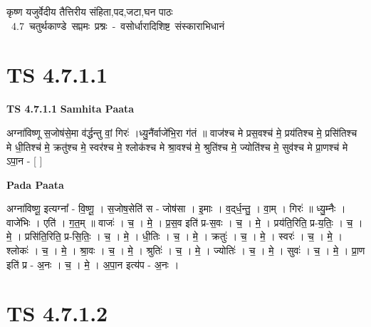 \documentclass[17pt]{extarticle}
\begin{document}
\begin{titlepage}
    \begin{center}
 
\begin{sanskrit}
    { \Large
    कृष्ण यजुर्वेदीय तैत्तिरीय संहिता,पद,जटा,घन पाठः 
    }
    \\
    \vspace{2.5cm}
    \mbox{ \Large
    4.7     चतुर्थकाण्डे सप्तमः प्रश्नः - वसोर्धारादिशिष्ट संस्काराभिधानं   }
\end{sanskrit}
\end{center}

\end{titlepage}
\tableofcontents
{}
\pagebreak


\section{ TS 4.7.1.1 }

\textbf{TS 4.7.1.1 } \newline
\textbf{Samhita Paata} \newline

अग्ना॑विष्णू स॒जोष॑से॒मा व॑र्द्धन्तु वां॒ गिरः॑ ।ध्यु॒नैंर्वाजे॑भि॒रा ग॑तं ॥ वाज॑श्च मे प्रस॒वश्च॑ मे॒ प्रय॑तिश्च मे॒ प्रसि॑तिश्च मे धी॒तिश्च॑ मे॒ क्रतु॑श्च मे॒ स्वर॑श्च मे॒ श्लोक॑श्च मे श्रा॒वश्च॑ मे॒ श्रुति॑श्च मे॒ ज्योति॑श्च मे॒ सुव॑श्च मे प्रा॒णश्च॑ मे ऽपा॒न - [  ] \newline

\textbf{Pada Paata} \newline

अग्ना॑विष्णू॒ इत्यग्ना᳚ - वि॒ष्णू॒ । स॒जोष॒सेति॑ स - जोष॑सा । इ॒माः । व॒द्‌र्ध॒न्तु॒ । वा॒म् । गिरः॑ ॥ ध्यु॒म्नैः । वाजे॑भिः । एति॑ । ग॒त॒म् ॥ वाजः॑ । च॒ । मे॒ । प्र॒स॒व इति॑ प्र-स॒वः । च॒ । मे॒ । प्रय॑ति॒रिति॒ प्र-य॒तिः॒ । च॒ । मे॒ । प्रसि॑ति॒रिति॒ प्र-सि॒तिः॒ । च॒ । मे॒ । धी॒तिः । च॒ । मे॒ । क्रतुः॑ । च॒ । मे॒ । स्वरः॑ । च॒ । मे॒ । श्लोकः॑ । च॒ । मे॒ । श्रा॒वः । च॒ । मे॒ । श्रुतिः॑ । च॒ । मे॒ । ज्योतिः॑ । च॒ । मे॒ । सुवः॑ । च॒ । मे॒ । प्रा॒ण इति॑ प्र - अ॒नः । च॒ । मे॒ । अ॒पा॒न इत्य॑प - अ॒नः ।  \newline





\section{ TS 4.7.1.2 }
\end{document}
